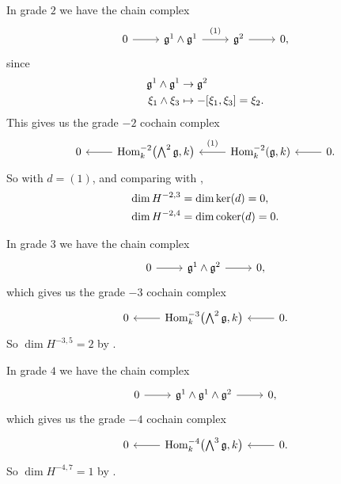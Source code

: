 In grade $2$ we have the chain complex
\[
  \begin{tikzcd}[ampersand replacement=\&]
    0 \ar[r] \& \lie{g}^{1} \wedge \lie{g}^{1} \ar[r, "{(1)}" {yshift=2pt}] \& \lie{g}^{2} \ar[r] \& 0,
  \end{tikzcd}
\]
since
\begin{align*}
  \mathfrak{g}^{1} \wedge \mathfrak{g}^{1} &\to \mathfrak{g}^{2} \\
  \xi_{1} \wedge \xi_{3} &\mapsto -[\xi_{1},\xi_{3}] = \xi_{2}.
\end{align*}
This gives us the grade $-2$ cochain complex
\[
  \begin{tikzcd}[ampersand replacement=\&]
    0 \& \ar[l] \Hom_{k}^{-2}\bigl( \bigwedge^{2} \lie{g}, k \bigr) \& \ar[l, "{(1)}"' {yshift=2pt}] \Hom_{k}^{-2}(\lie{g},k) \& \ar[l] 0.
  \end{tikzcd}
\]
So with $d = (1)$, and comparing with ,
\begin{align*}
  \dim H^{-2,3} &= \dim \operatorname{ker}(d) = 0, \\
  \dim H^{-2,4} &= \dim \operatorname{coker}(d) = 0.
\end{align*}

In grade $3$ we have the chain complex
\[
  \begin{tikzcd}
    0 \ar[r] & \lie{g}^{1} \wedge \lie{g}^{2} \ar[r] & 0,
  \end{tikzcd}
\]
which gives us the grade $-3$ cochain complex
\[
  \begin{tikzcd}
    0 & \ar[l] \Hom_{k}^{-3}\bigl( \bigwedge^{2}\lie{g}, k \bigr) & \ar[l] 0.
  \end{tikzcd}
\]
So $\dim H^{-3,5} = 2$ by .

In grade $4$ we have the chain complex
\[
  \begin{tikzcd}
    0 \ar[r] & \lie{g}^{1} \wedge \lie{g}^{1} \wedge \lie{g}^{2}  \ar[r] & 0,
  \end{tikzcd}
\]
which gives us the grade $-4$ cochain complex
\[
  \begin{tikzcd}
    0 & \ar[l] \Hom_{k}^{-4}\bigl( \bigwedge^{3}\lie{g}, k \bigr) & \ar[l] 0.
  \end{tikzcd}
\]
So $\dim H^{-4,7} = 1$ by .

